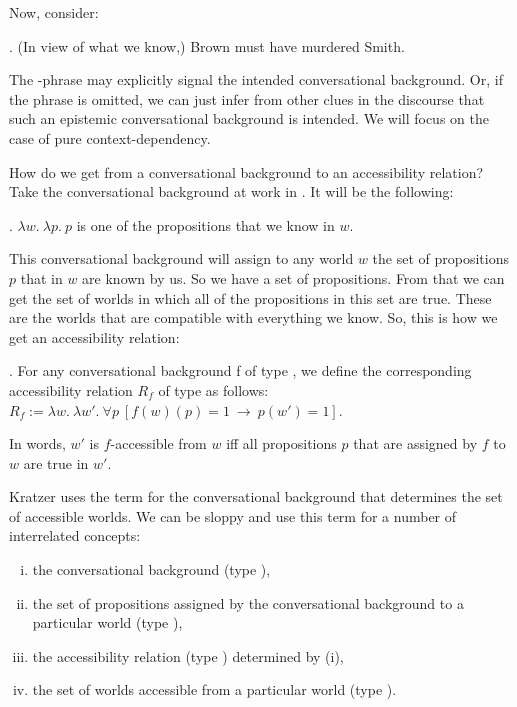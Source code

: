 Now, consider:

\ex. (In view of what we know,) Brown must have murdered Smith.

The -phrase may explicitly signal the intended
conversational background. Or, if the phrase is omitted, we can just
infer from other clues in the discourse that such an epistemic
conversational background is intended. We will focus on the case of
pure context-dependency.

How do we get from a conversational background to an accessibility
relation? Take the conversational background at work in \Last. It will
be the following:

\ex. $\lambda w.\ \lambda p.\ p$ is one of the propositions that we know in $w$.

This conversational background will assign to any world $w$ the set of
propositions $p$ that in $w$ are known by us. So we have a set of
propositions. From that we can get the set of worlds in which all of
the propositions in this set are true. These are the worlds that are
compatible with everything we know. So, this is how we get an
accessibility relation:

\ex. \label{convers} For any conversational background f of type , we define the corresponding accessibility relation $R_{f}$ of type  as follows: \\
$R_{f} := \lambda w.\ \lambda w'.\ \forall p\ [ f(w)(p)=1\ \rightarrow\ p(w')=1 ]$.

\enlargethispage{24pt}In words, $w'$ is $f$-accessible from $w$ iff all propositions $p$ that are assigned by $f$ to $w$ are true in $w'$.

Kratzer uses the term  for the conversational
background that determines the set of accessible worlds. We can be
sloppy and use this term for a number of interrelated concepts:

\begin{enumerate}[(i)] 
	\item the conversational background (type ), 
	\item the set of propositions assigned by the conversational
    background to a particular world (type ),
	\item the accessibility relation (type ) determined by (i), 
	\item the set of worlds accessible from a particular world (type ). 
\end{enumerate}

